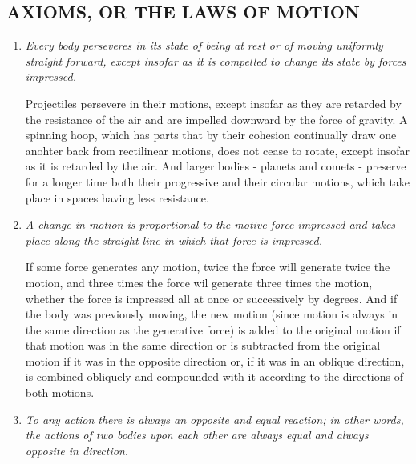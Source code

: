 \subsection*{AXIOMS, OR THE LAWS OF MOTION}

\begin{enumerate}[label = \textbf{Law \arabic*} \hspace{0.3cm}]
    \item \textit{Every body perseveres in its state of being at rest or of moving uniformly straight forward, except insofar as it is compelled to change its state by forces impressed.}
    \vspace{0.25cm}
    
    \hspace{0.3cm} Projectiles persevere in their motions, except insofar as they are retarded by the resistance of the air and are impelled downward by the force of gravity. A spinning hoop, which has parts that by their cohesion continually draw one anohter back from rectilinear motions, does not cease to rotate, except insofar as it is retarded by the air. And larger bodies - planets and comets - preserve for a longer time both their progressive and their circular motions, which take place in spaces having less resistance.
    \item \textit{A change in motion is proportional to the motive force impressed and takes place along the straight line in which that force is impressed.} 
     \vspace{0.25cm}
    
    \hspace{0.3cm} If some force generates any motion, twice the force will generate twice the motion, and three times the force wil generate three times the motion, whether the force is impressed all at once or successively by degrees. And if the body was previously moving, the new motion (since motion is always in the same direction as the generative force) is added to the original motion if that motion was in the same direction or is subtracted from the original motion if it was in the opposite direction or, if it was in an oblique direction, is combined obliquely and compounded with it according to the directions of both motions.
    \item \textit{To any action there is always an opposite and equal reaction; in other words, the actions of two bodies upon each other are always equal and always opposite in direction.}
     \vspace{0.25cm}
    

\end{enumerate}
